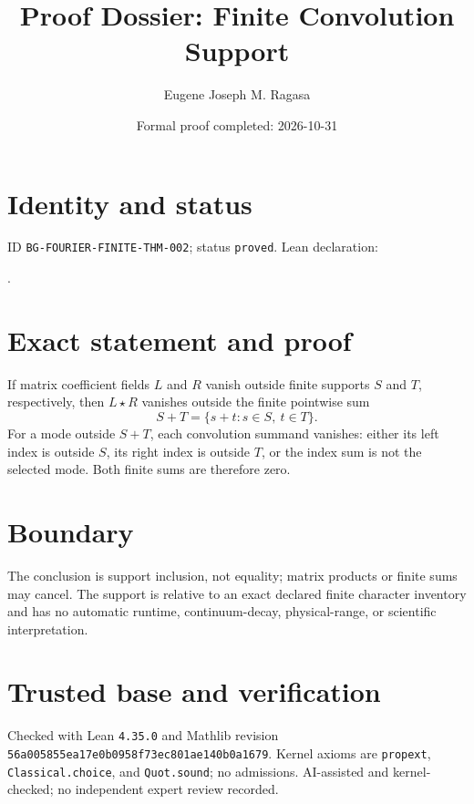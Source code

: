 \documentclass[11pt]{article}
\title{Proof Dossier: Finite Convolution Support}\author{Eugene Joseph M. Ragasa}\date{Formal proof completed: 2026-10-31}
\begin{document}
\maketitle
\section{Identity and status}
ID \texttt{BG-FOURIER-FINITE-THM-002}; status \texttt{proved}. Lean declaration:
\par{}.
\section{Exact statement and proof}
If matrix coefficient fields $L$ and $R$ vanish outside finite supports $S$ and $T$, respectively,
then $L\star R$ vanishes outside the finite pointwise sum
\[
  S+T=\{s+t:s\in S,\ t\in T\}.
\]
For a mode outside $S+T$, each convolution summand vanishes: either its left index is outside $S$,
its right index is outside $T$, or the index sum is not the selected mode. Both finite sums are
therefore zero.
\section{Boundary}
The conclusion is support inclusion, not equality; matrix products or finite sums may cancel. The
support is relative to an exact declared finite character inventory and has no automatic runtime,
continuum-decay, physical-range, or scientific interpretation.
\section{Trusted base and verification}
Checked with Lean \texttt{4.35.0} and Mathlib revision
\texttt{56a005855ea17e0b0958f73ec801ae140b0a1679}. Kernel axioms are
\texttt{propext}, \texttt{Classical.choice}, and \texttt{Quot.sound}; no admissions.
AI-assisted and kernel-checked; no independent expert review recorded.
\end{document}
